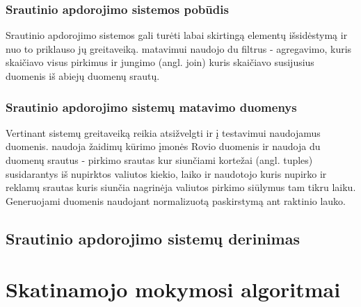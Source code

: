 \documentclass{VUMIFPSbakalaurinis}
\begin{document}
\subsubsection{Srautinio apdorojimo sistemos pobūdis}

Srautinio apdorojimo sistemos gali turėti labai skirtingą elementų išsidėstymą ir nuo to priklauso jų greitaveiką. \cite{Karimov2018BenchmarkingDS} matavimui naudojo du filtrus - agregavimo, kuris skaičiavo visus pirkimus ir jungimo (angl. join) kuris skaičiavo susijusius duomenis iš abiejų duomenų srautų.    

\subsubsection{Srautinio apdorojimo sistemų matavimo duomenys}

Vertinant sistemų greitaveiką reikia atsižvelgti ir į testavimui naudojamus duomenis. \cite{Karimov2018BenchmarkingDS} naudoja žaidimų kūrimo įmonės Rovio duomenis ir naudoja du duomenų srautus - pirkimo srautas kur siunčiami kortežai (angl. tuples) susidarantys iš nupirktos valiutos kiekio, laiko ir naudotojo kuris nupirko ir reklamų srautas kuris siunčia nagrinėja valiutos pirkimo siūlymus tam tikru laiku. Generuojami duomenis naudojant normalizuotą paskirstymą ant raktinio lauko.    


\subsection{Srautinio apdorojimo sistemų derinimas}

\section{Skatinamojo mokymosi algoritmai}

\printbibliography[heading=bibintoc] 
\end{document}
